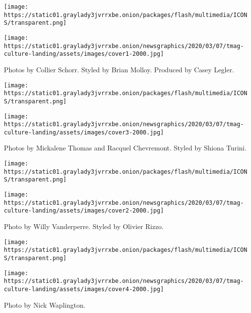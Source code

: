 \href{https://www.nytimes3xbfgragh.onion/interactive/2020/04/13/t-magazine/butch-stud-lesbian.html}{}

\texttt{[image: https://static01.graylady3jvrrxbe.onion/packages/flash/multimedia/ICONS/transparent.png]}

\texttt{[image: https://static01.graylady3jvrrxbe.onion/newsgraphics/2020/03/07/tmag-culture-landing/assets/images/cover1-2000.jpg]}

Photos by Collier Schorr. Styled by Brian Molloy. Produced by Casey
Legler.

\href{https://www.nytimes3xbfgragh.onion/interactive/2020/04/13/t-magazine/black-actresses-bassett-berry-blige-henson-whitfield-elise.html}{}

\texttt{[image: https://static01.graylady3jvrrxbe.onion/packages/flash/multimedia/ICONS/transparent.png]}

\texttt{[image: https://static01.graylady3jvrrxbe.onion/newsgraphics/2020/03/07/tmag-culture-landing/assets/images/cover3-2000.jpg]}

Photos by Mickalene Thomas and Racquel Chevremont. Styled by Shiona
Turini.

\href{https://www.nytimes3xbfgragh.onion/interactive/2020/04/13/t-magazine/dominican-republic-models.html}{}

\texttt{[image: https://static01.graylady3jvrrxbe.onion/packages/flash/multimedia/ICONS/transparent.png]}

\texttt{[image: https://static01.graylady3jvrrxbe.onion/newsgraphics/2020/03/07/tmag-culture-landing/assets/images/cover2-2000.jpg]}

Photo by Willy Vanderperre. Styled by Olivier Rizzo.

\href{https://www.nytimes3xbfgragh.onion/interactive/2020/04/13/t-magazine/maria-cornejo-olivier-rousteing-telfar-clemens-alessandro-michele.html\#alessandro-michele-and-co}{}

\texttt{[image: https://static01.graylady3jvrrxbe.onion/packages/flash/multimedia/ICONS/transparent.png]}

\texttt{[image: https://static01.graylady3jvrrxbe.onion/newsgraphics/2020/03/07/tmag-culture-landing/assets/images/cover4-2000.jpg]}

Photo by Nick Waplington.

